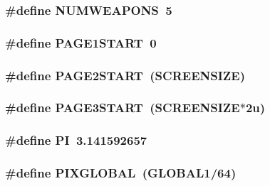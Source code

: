 \label{WL__DEF_8H_a58867ea52d9495b87bc4afa660b92e8a}
\hypertarget{WL__DEF_8H_a32860c003347d9f75cea6cf2f1ae0362}{
\subsubsection[{NUMWEAPONS}]{\setlength{\rightskip}{0pt plus 5cm}\#define NUMWEAPONS~5}}
\label{WL__DEF_8H_a32860c003347d9f75cea6cf2f1ae0362}
\hypertarget{WL__DEF_8H_a98d181b7ac3c8967b0f2c26f721af4e2}{
\subsubsection[{PAGE1START}]{\setlength{\rightskip}{0pt plus 5cm}\#define PAGE1START~0}}
\label{WL__DEF_8H_a98d181b7ac3c8967b0f2c26f721af4e2}
\hypertarget{WL__DEF_8H_a4c3826f8d60a210551ac20e24caeaa15}{
\subsubsection[{PAGE2START}]{\setlength{\rightskip}{0pt plus 5cm}\#define PAGE2START~(SCREENSIZE)}}
\label{WL__DEF_8H_a4c3826f8d60a210551ac20e24caeaa15}
\hypertarget{WL__DEF_8H_a60874ea1b4f76e6aa73dbcbda2f24be2}{
\subsubsection[{PAGE3START}]{\setlength{\rightskip}{0pt plus 5cm}\#define PAGE3START~(SCREENSIZE$\ast$2u)}}
\label{WL__DEF_8H_a60874ea1b4f76e6aa73dbcbda2f24be2}
\hypertarget{WL__DEF_8H_a598a3330b3c21701223ee0ca14316eca}{
\subsubsection[{PI}]{\setlength{\rightskip}{0pt plus 5cm}\#define PI~3.141592657}}
\label{WL__DEF_8H_a598a3330b3c21701223ee0ca14316eca}
\hypertarget{WL__DEF_8H_a989bdb548363bcaca8616280e647424f}{
\subsubsection[{PIXGLOBAL}]{\setlength{\rightskip}{0pt plus 5cm}\#define PIXGLOBAL~(GLOBAL1/64)}}
